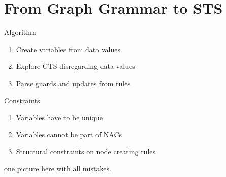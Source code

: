 \documentclass{FMTslides}
\begin{document}
\section[GG2STS]{From Graph Grammar to STS}

\begin{frame}{Algorithm}
\begin{enumerate}[<+->]
\item Create variables from data values
\item Explore GTS disregarding data values
\item Parse guards and updates from rules
\end{enumerate}
\begin{figure}
\centering
\end{figure}
\end{frame}

\begin{frame}{Constraints}
  \begin{enumerate}[<+->]
    \item Variables have to be unique
    \item Variables cannot be part of NACs
    \item Structural constraints on node creating rules
  \end{enumerate}
  one picture here with all mistakes.
\end{frame}
\end{document}
